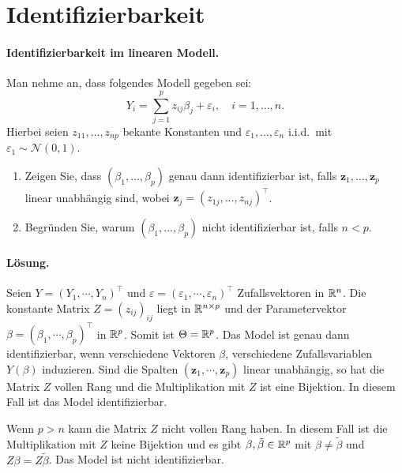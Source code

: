 
\section{Identifizierbarkeit}

\paragraph{Identifizierbarkeit im linearen Modell. } 
Man nehme an, dass folgendes Modell gegeben sei: 
\begin{equation*}
    Y_i = \sum_{j=1}^{p} z_{ij} \beta_j + \varepsilon_i, \quad i=1,\ldots,n. 
\end{equation*}
Hierbei seien $z_{11},\ldots,z_{np}$ bekante Konstanten und $\varepsilon_1,\ldots,\varepsilon_n$
i.i.d.\ mit $\varepsilon_1 \sim \mathcal N\left( 0,1 \right)$.
\begin{enumerate}
    \item Zeigen Sie, dass $\left( \beta_1,\ldots,\beta_p \right)$ genau dann
        identifizierbar ist, falls $\mathbf z_1,\ldots,\mathbf z_p$ linear
        unabhängig sind, wobei $\mathbf z_j = \left( z_{1j},\ldots,z_{nj}
        \right)^\top$.
    \item Begründen Sie, warum $\left( \beta_1, \ldots,\beta_p \right)$ nicht
        identifizierbar ist, falls $n<p$.
\end{enumerate}

\paragraph*{Lösung.}
Seien $Y = \left( Y_1, \cdots, Y_n \right)^\top$ und $\varepsilon = \left(
\varepsilon_1, \cdots, \varepsilon_n \right)^\top$ Zufallsvektoren in $\mathbb R^{n}$.
Die konstante Matrix $Z=\left( z_{ij} \right)_{ij}$ liegt in $\mathbb R^{n \times p}$
und der Parametervektor $\beta = \left( \beta_1, \cdots, \beta_p
\right)^{\top}$ in $\mathbb R^{p}$.  Somit ist $\Theta = \mathbb R^{p}$. Das Model ist genau
dann identifizierbar, wenn verschiedene Vektoren $\beta$, verschiedene
Zufallsvariablen $Y(\beta)$ induzieren. Sind die Spalten $\left( \mathbf{z}_1,
\cdots, \mathbf{z}_p \right)$ linear unabhängig, so hat die Matrix $Z$ vollen
Rang und die Multiplikation mit $Z$ ist eine Bijektion. In diesem Fall ist das
Model identifizierbar. 

Wenn $p>n$ kann die Matrix $Z$ nicht vollen Rang haben. In diesem Fall ist die
Multiplikation mit $Z$ keine Bijektion und es gibt $\beta,\tilde \beta \in
\mathbb R^{p}$ mit $\beta \neq \tilde \beta$ und $Z \beta = Z \tilde \beta$. Das Model
ist nicht identifizierbar. 



